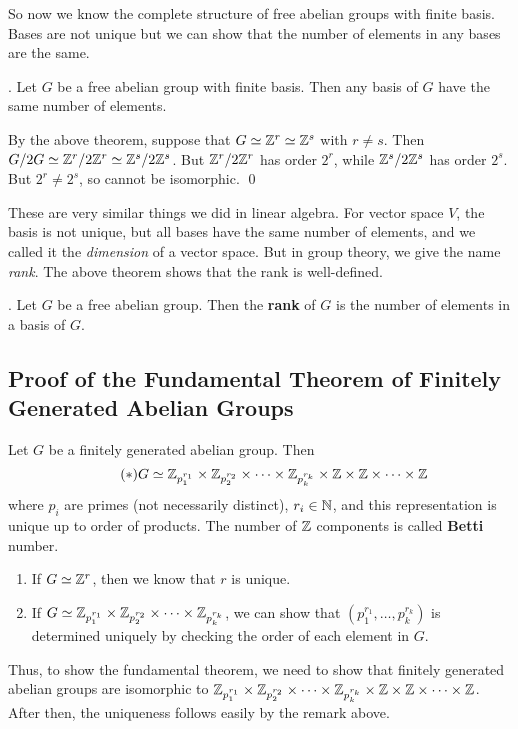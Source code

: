 So now we know the complete structure of free abelian groups with finite basis. Bases are not unique but we can show that the number of elements in any bases are the same.

\thm. Let \(G\) be a free abelian group with finite basis. Then any basis of \(G\) have the same number of elements.

\pf By the above theorem, suppose that \(G \simeq \mathbb{Z}^r \simeq \mathbb{Z}^s\) with \(r\neq s\). Then \(G/2G \simeq \mathbb{Z}^r/2\mathbb{Z}^r \simeq \mathbb{Z}^s/2\mathbb{Z}^s\). But \(\mathbb{Z}^r/2\mathbb{Z}^r\) has order \(2^r\), while \(\mathbb{Z}^s/2\mathbb{Z}^s\) has order \(2^s\). But \(2^r \neq 2^s\), so cannot be isomorphic. \qed

These are very similar things we did in linear algebra. For vector space \(V\), the basis is not unique, but all bases have the same number of elements, and we called it the \textit{dimension} of a vector space. But in group theory, we give the name \textit{rank}. The above theorem shows that the rank is well-defined.

.  Let \(G\) be a free abelian group. Then the \textbf{rank} of \(G\) is the number of elements in a basis of \(G\).

\subsection*{Proof of the Fundamental Theorem of Finitely Generated Abelian Groups}

\recall Let \(G\) be a finitely generated abelian group. Then
\[ \tag{\mast}
    G \simeq \Z_{p_1^{r_1}} \times \Z_{p_2^{r_2}} \times \cdots \times \Z_{p_k^{r_k}} \times \Z \times \Z \times \cdots \times \Z
\]
where \(p_i\) are primes (not necessarily distinct), \(r_i \in \mathbb{N}\), and this representation is unique up to order of products. The number of \(\mathbb{Z}\) components is called \textbf{Betti} number.

\rmk
\begin{enumerate}
    \item If \(G \simeq \mathbb{Z}^r\), then we know that \(r\) is unique.
    \item If \(G \simeq \mathbb{Z}_{p_1^{r_1}} \times \mathbb{Z}_{p_2^{r_2}} \times \cdots \times \mathbb{Z}_{p_k^{r_k}}\), we can show that \((p_1^{r_1}, \dots, p_k^{r_k})\) is determined uniquely by checking the order of each element in \(G\).
\end{enumerate}

Thus, to show the fundamental theorem, we need to show that finitely generated abelian groups are isomorphic to \(\mathbb{Z}_{p_1^{r_1}} \times \mathbb{Z}_{p_2^{r_2}} \times \cdots \times \mathbb{Z}_{p_k^{r_k}} \times \mathbb{Z} \times \mathbb{Z} \times \cdots \times \mathbb{Z}\). After then, the uniqueness follows easily by the remark above.

